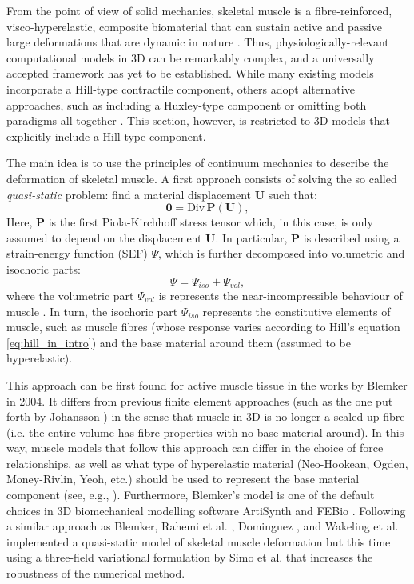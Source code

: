 \documentclass{sfuthesis}
\numberwithin{equation}{section}
\numberwithin{figure}{chapter}
\numberwithin{table}{chapter}
\theoremstyle{definition}
\def\*#1{{\mathbf{#1}}} %
\newcommand{\Divt}[1]{{\bm{\mathrm{Div}} \, #1}}
\begin{document}
From the point of view of solid mechanics, skeletal muscle is a fibre-reinforced, visco-hyperelastic, composite biomaterial that can sustain active and passive large deformations that are dynamic in nature \cite{AlmonacidEtAl2022_SIAP_Paper,Paper3_RossEtAl2021,Paper1_WakelingEtAl2020}. Thus, physiologically-relevant computational models in 3D can be remarkably complex, and a universally accepted framework has yet to be established. While many existing models incorporate a Hill-type contractile component, others adopt alternative approaches, such as including a Huxley-type component \cite{Oomens2003} or omitting both paradigms all together \cite{Giantesio2024,OdegardEtAl2008}. This section, however, is restricted to 3D models that explicitly include a Hill-type component.

The main idea is to use the principles of continuum mechanics to describe the deformation of skeletal muscle. A first approach consists of solving the so called \textit{quasi-static} problem: find a material displacement $\*U$ such that:
\begin{equation} \label{eq:intro_quasistatic_problem}
    \*0 = \Divt{\*P(\*U)},
\end{equation}
Here, $\*P$ is the first Piola-Kirchhoff stress tensor which, in this case, is only assumed to depend on the displacement $\*U$. In particular, $\*P$ is described using a strain-energy function (SEF) $\Psi$, which is further decomposed into volumetric and isochoric parts:
\begin{equation}
    \Psi = \Psi_{iso} + \Psi_{vol},
\end{equation}
where the volumetric part $\Psi_{vol}$ is represents the near-incompressible behaviour of muscle \cite{BaskinPaolini}. In turn, the isochoric part $\Psi_{iso}$ represents the constitutive elements of muscle, such as muscle fibres (whose response varies according to Hill's equation \eqref{eq:hill_in_intro}) and the base material around them (assumed to be hyperelastic). 

This approach can be first found for active muscle tissue in the works by Blemker \cite{BlemkerThesis,BlemkerDelp2005,BlemkerPinskyDelp2005} in 2004. It differs from previous finite element approaches (such as the one put forth by Johansson \cite{Johansson2000}) in the sense that muscle in 3D is no longer a scaled-up fibre (i.e. the entire volume has fibre properties with no base material around). In this way, muscle models that follow this approach can differ in the choice of force relationships, as well as what type of hyperelastic material (Neo-Hookean, Ogden, Money-Rivlin, Yeoh, etc.) should be used to represent the base material component (see, e.g., \cite{HeidlaufRohrle2013,Tang2007}). Furthermore, Blemker's model is one of the default choices in 3D biomechanical modelling software ArtiSynth \cite{Artisynth} and FEBio \cite{FEBio}. Following a similar approach as Blemker, Rahemi et al. \cite{RahemiNigamWakeling2014,RahemiNigamWakeling2015}, Dominguez \cite{Seba}, and Wakeling et al. \cite{Paper1_WakelingEtAl2020} implemented a quasi-static model of skeletal muscle deformation but this time using a three-field variational formulation by Simo et al. \cite{SimoTaylorPister1985} that increases the robustness of the numerical method.
\end{document}
